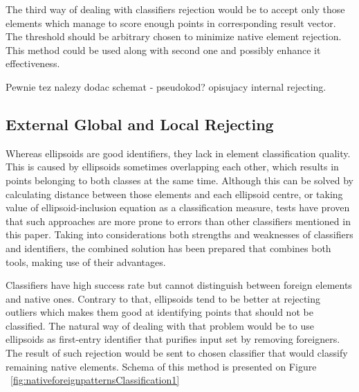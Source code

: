 \documentclass{llncs}
\begin{document}
The third way of dealing with classifiers rejection would be to accept only those elements which manage to score enough points in corresponding result vector. The threshold should be arbitrary chosen to minimize native element rejection. This method could be used along with second one and possibly enhance it effectiveness.

{\color{blue} Pewnie tez nalezy dodac schemat - pseudokod? opisujacy internal rejecting.}

\subsection{External Global and Local Rejecting}
  \label{subsec:GlobalLocalRejecting}

Whereas ellipsoids are good identifiers, they lack in element classification quality. This is caused by ellipsoids sometimes overlapping each other, which results in points belonging to both classes at the same time. Although this can be solved by calculating distance between those elements and each ellipsoid centre, or taking value of ellipsoid-inclusion equation as a classification measure, tests have proven that such approaches are more prone to errors than other classifiers mentioned in this paper. Taking into considerations both strengths and weaknesses of classifiers and identifiers, the combined solution has been prepared that combines both tools, making use of their advantages.

Classifiers have high success rate but cannot distinguish between foreign elements and native ones. Contrary to that, ellipsoids tend to be better at rejecting outliers which makes them good at identifying points that should not be classified. The natural way of dealing with that problem would be to use ellipsoids as first-entry identifier that purifies input set by removing foreigners. The result of such rejection would be sent to chosen classifier that would classify remaining native elements. Schema of this method is presented on Figure ~\ref{fig:nativeforeignpatternsClassification1}
\end{document}
